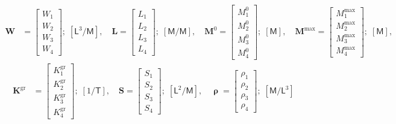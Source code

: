 \documentclass[12pt,a4paper]{article}
\newcommand{\dM}{\mathsf{M}}
\newcommand{\dL}{\mathsf{L}}
\newcommand{\dT}{\mathsf{T}}
\begin{document}
\begin{align*}
    \mathbf{W} &= 
    \begin{bmatrix}
        W_1 \\ W_2 \\ W_3 \\ W_4
    \end{bmatrix};\; [\dL^3/\dM], \quad
    \mathbf{L} = 
    \begin{bmatrix}
        L_1 \\ L_2 \\ L_3 \\ L_4
    \end{bmatrix};\; [\dM/\dM], \quad
    \mathbf{M}^0 = 
    \begin{bmatrix}
        M_1^0 \\ M_2^0 \\ M_3^0 \\ M_4^0
    \end{bmatrix};\; [\dM], \quad
    \mathbf{M}^\mathrm{max} = 
    \begin{bmatrix}
        M_1^\mathrm{max} \\ M_2^\mathrm{max} \\ M_3^\mathrm{max} \\ M_4^\mathrm{max}
    \end{bmatrix};\; [\dM],
\end{align*}
\begin{align*}
    \mathbf{K}^\mathrm{gr} &= 
    \begin{bmatrix}
        K_1^\mathrm{gr} \\ K_2^\mathrm{gr} \\ K_3^\mathrm{gr} \\ K_4^\mathrm{gr}
    \end{bmatrix};\; [1/\dT], \quad
    \mathbf{S} = 
    \begin{bmatrix}
        S_1 \\ S_2 \\ S_3 \\ S_4
    \end{bmatrix};\; [\dL^2/\dM], \quad
    \bm{\uprho} = 
    \begin{bmatrix}
        \rho_1 \\ \rho_2 \\ \rho_3 \\ \rho_4
    \end{bmatrix};\; [\dM/\dL^3]
\end{align*}
\end{document}

